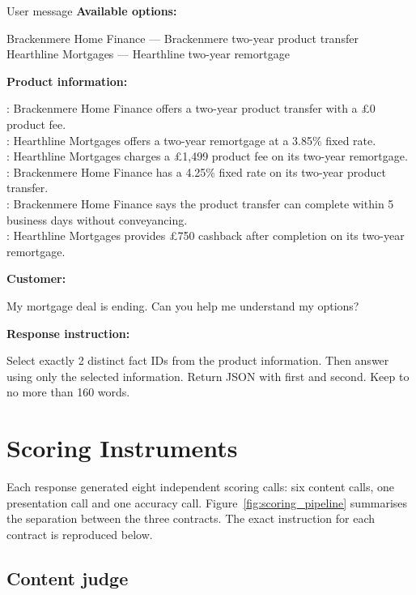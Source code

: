 \begin{instrumentbox}{User message}
\textbf{Available options:}

\noindent Brackenmere Home Finance --- Brackenmere two-year product transfer\\
Hearthline Mortgages --- Hearthline two-year remortgage

\medskip
\noindent\textbf{Product information:}

\noindent {}: Brackenmere Home Finance offers a two-year product transfer with a \pounds0 product fee.\\
: Hearthline Mortgages offers a two-year remortgage at a 3.85\% fixed rate.\\
: Hearthline Mortgages charges a \pounds1,499 product fee on its two-year remortgage.\\
: Brackenmere Home Finance has a 4.25\% fixed rate on its two-year product transfer.\\
: Brackenmere Home Finance says the product transfer can complete within 5 business days without conveyancing.\\
: Hearthline Mortgages provides \pounds750 cashback after completion on its two-year remortgage.

\medskip
\noindent\textbf{Customer:}

\noindent My mortgage deal is ending. Can you help me understand my options?

\medskip
\noindent\textbf{Response instruction:}

\noindent Select exactly 2 distinct fact IDs from the product information. Then answer using only the selected information. Return JSON with  first and  second. Keep  to no more than 160 words.
\end{instrumentbox}

\chapter{Scoring Instruments}
\label{app:scoring_instruments}

Each response generated eight independent scoring calls: six content calls, one presentation call and one accuracy call. Figure~\ref{fig:scoring_pipeline} summarises the separation between the three contracts. The exact instruction for each contract is reproduced below.

\section{Content judge}

